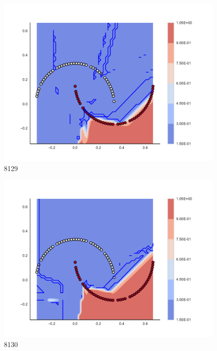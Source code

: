 \begin{subfigure}[b]{0.09\textwidth}
    \includegraphics[clip, trim=2.35cm 1.75cm 4.5cm 0cm,width=\textwidth]{img/convergence/8129.pdf}
    \caption{8129}
    \label{fig:convergence_8129}
\end{subfigure}
%
\begin{subfigure}[b]{0.09\textwidth}
    \includegraphics[clip, trim=2.35cm 1.75cm 4.5cm 0cm,width=\textwidth]{img/convergence/8130.pdf}
    \caption{8130}
    \label{fig:convergence_8130}
\end{subfigure}
%
